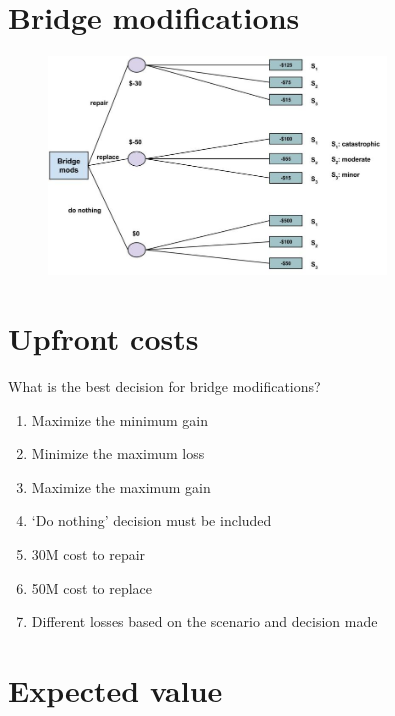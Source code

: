 \documentclass[aspectratio=1610,pdftex,dvipsnames,compress,xcolor={dvipsnames}]{beamer}
\begin{document}
\section{Bridge modifications}


\addtocounter{framenumber}{-1}
\begin{frame}{}
    \begin{figure}
        \centering
        \includegraphics[width=0.80\textwidth]{bridge.mods.jpg}
    \end{figure}
\end{frame}


\section{Upfront costs}


\addtocounter{framenumber}{-1}
\begin{frame}{What is the best decision for bridge modifications?}
    \begin{enumerate}[series=outerlist,topsep=0pt,itemsep=15pt,leftmargin=*,label=(\arabic*)]
        \item[]Maximize the minimum gain
        \item[]Minimize the maximum loss
        \item[]Maximize the maximum gain
        \item[]`Do nothing' decision must be included
        \item[]30M cost to repair
        \item[]50M cost to replace
        \item[]Different losses based on the scenario and decision made
    \end{enumerate}
\end{frame}


\section{Expected value}
\end{document}
